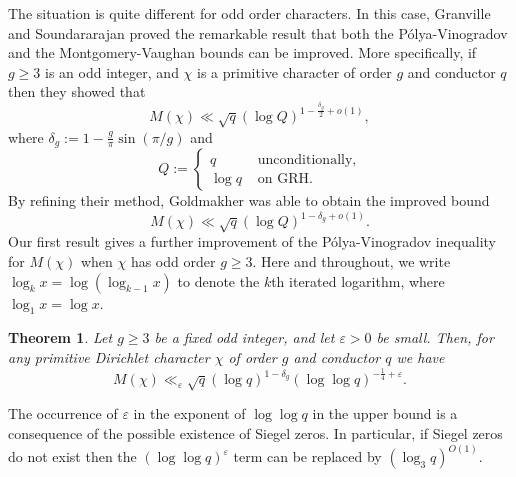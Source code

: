 \documentclass[12pt]{amsart}
\newtheorem{thm}{Theorem}[section]
\theoremstyle{definition}
\numberwithin{equation}{section}
\newcommand{\e}{\varepsilon}
\begin{document}
The situation is quite different for odd order characters. In this case, Granville and Soundararajan \cite{GrSo2} proved the remarkable result that both the P\'{o}lya-Vinogradov and the Montgomery-Vaughan bounds can be improved. More specifically, if $g\geq 3$ is an odd integer, and $\chi$ is a primitive character of order $g$ and conductor $q$ then they showed that
\begin{equation} \label{GSUP}
M(\chi) \ll \sqrt{q} (\log Q)^{1-\frac{\delta_g}{2} + o(1)},
\end{equation}
where $\delta_g := 1-\frac{g}{\pi}\sin(\pi/g)$ and 
\begin{equation}\label{THEQ}
Q := \begin{cases}  q &\text{ unconditionally}, \\  \log q &\text{ on GRH}. \end{cases}
\end{equation}
By refining their method, Goldmakher \cite{GOLD} was able to obtain the improved bound
\begin{equation} \label{GOLDSUP}
M(\chi) \ll \sqrt{q} (\log Q)^{1-\delta_g + o(1)}.
\end{equation}
Our first result gives a further improvement of the P\'olya-Vinogradov inequality for $M(\chi)$ when $\chi$ has odd order $g\geq 3$. Here and throughout, we write $\log_k x = \log(\log_{k-1} x)$ to denote the $k$th iterated logarithm, where $\log_1 x=\log x$.
\begin{thm}\label{MCHIUP1}
Let $g \geq 3$ be a fixed odd integer, and let $\e > 0$ be small. Then, for any primitive Dirichlet character $\chi$ of order $g$ and conductor $q$  we have
$$
M(\chi) \ll_{\e} \sqrt{q} \left(\log q\right)^{1-\delta_g}(\log\log  q)^{-\frac{1}{4}+ \e}.
$$
\end{thm}
\noindent The occurrence of $\e$ in the exponent of $\log\log q$ in the upper bound is a consequence of the possible existence of Siegel zeros. In particular, if Siegel zeros do not exist then the $(\log\log q)^{\e}$ term can be replaced by $(\log _3 q)^{O(1)}.$
\end{document}
